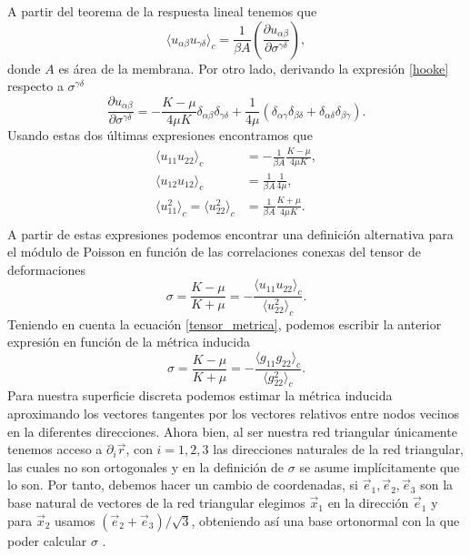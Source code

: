 A partir del teorema de la respuesta lineal \cite{Binney:critical_phenomema}
tenemos que
\begin{equation*}
\langle u_{\alpha\beta}u_{\gamma\delta} \rangle_c
=\frac{1}{\beta A}\left(\frac{\partial u_{\alpha\beta}}{\partial \sigma^{\gamma\delta}}\right),
\end{equation*}
donde $A$ es área de la membrana. Por otro lado, derivando la expresión
\eqref{hooke} respecto a $\sigma^{\gamma\delta}$
\begin{equation*}
\frac{\partial u_{\alpha\beta}}{\partial
  \sigma^{\gamma\delta}}=-\frac{K-\mu}{4\mu K}\delta_{\alpha\beta}\delta_{\gamma\delta}+\frac{1}{4\mu}(\delta_{\alpha\gamma}\delta_{\beta\delta}+\delta_{\alpha\delta}\delta_{\beta\gamma}).
\end{equation*}
Usando estas dos últimas expresiones encontramos que 
\begin{align*}
\langle u_{11}u_{22} \rangle_c&=-\frac{1}{\beta A}\frac{K-\mu}{4\mu K},\\
\langle u_{12}u_{12} \rangle_c&=\frac{1}{\beta A}\frac{1}{4\mu},\\
\langle u_{11}^2 \rangle_c=\langle u_{22}^2 \rangle_c&=\frac{1}{\beta A}\frac{K+\mu}{4\mu K}.\\
\end{align*}
A partir de estas expresiones podemos encontrar una definición alternativa
para el módulo de Poisson \cite{Zang_Dmolecular,Parrinello_Crystal} en
función de las correlaciones conexas del tensor de deformaciones
\begin{equation*}
\sigma=\frac{K-\mu}{K+\mu}=-\frac{\langle u_{11}u_{22}
  \rangle_c}{\langle u_{22}^2 \rangle_c}.
\end{equation*}
Teniendo en cuenta la ecuación \eqref{tensor_metrica}, podemos escribir la anterior
expresión en función de la métrica inducida 
\begin{equation*}
\sigma=\frac{K-\mu}{K+\mu}=-\frac{\langle g_{11}g_{22}
  \rangle_c}{\langle g_{22}^2 \rangle_c}.
\end{equation*}
Para nuestra superficie discreta podemos estimar la métrica inducida
aproximando los vectores tangentes por los vectores relativos entre nodos
vecinos en la diferentes direcciones. Ahora bien, al ser nuestra red
triangular únicamente tenemos acceso a $\partial_i \vec{r}$, con $i=1,2,3$ las
direcciones naturales de la red triangular, las cuales no son ortogonales y en
la definición de $\sigma$ se asume implícitamente que lo son. Por tanto,
debemos hacer un cambio de coordenadas, si $\vec{e}_1,\vec{e}_2,\vec{e}_3$ son
la base natural de vectores de la red triangular elegimos
$\vec{x}_1$ en la dirección $\vec{e}_1$ y para $\vec{x}_2$ usamos
$(\vec{e}_2+\vec{e}_3)/\sqrt{3}$, obteniendo así una base ortonormal con la
que poder calcular $\sigma$ \cite{Bowick_poisson_ratio}.

